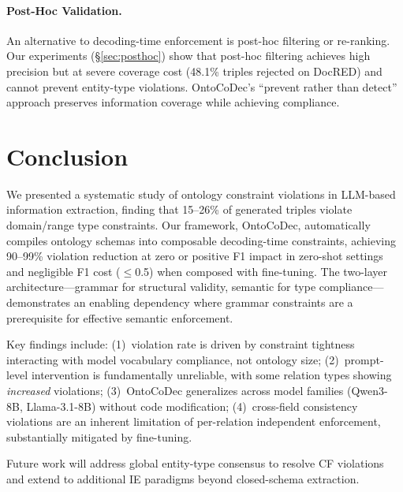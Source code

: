\documentclass[11pt,a4paper]{article}
\newcommand{\sys}{OntoCoDec}
\newcommand{\pp}{\text{pp}}
\begin{document}
\paragraph{Post-Hoc Validation.}
An alternative to decoding-time enforcement is post-hoc filtering or re-ranking.
Our experiments (\S\ref{sec:posthoc}) show that post-hoc filtering achieves high precision but at severe coverage cost (48.1\% triples rejected on DocRED) and cannot prevent entity-type violations.
\sys{}'s ``prevent rather than detect'' approach preserves information coverage while achieving compliance.

\section{Conclusion}
\label{sec:conclusion}

We presented a systematic study of ontology constraint violations in LLM-based information extraction, finding that 15--26\% of generated triples violate domain/range type constraints.
Our framework, \sys{}, automatically compiles ontology schemas into composable decoding-time constraints, achieving 90--99\% violation reduction at zero or positive F1 impact in zero-shot settings and negligible F1 cost ($\leq$0.5\pp{}) when composed with fine-tuning.
The two-layer architecture---grammar for structural validity, semantic for type compliance---demonstrates an enabling dependency where grammar constraints are a prerequisite for effective semantic enforcement.

Key findings include: (1)~violation rate is driven by constraint tightness interacting with model vocabulary compliance, not ontology size; (2)~prompt-level intervention is fundamentally unreliable, with some relation types showing \emph{increased} violations; (3)~\sys{} generalizes across model families (Qwen3-8B, Llama-3.1-8B) without code modification; (4)~cross-field consistency violations are an inherent limitation of per-relation independent enforcement, substantially mitigated by fine-tuning.

Future work will address global entity-type consensus to resolve CF violations and extend to additional IE paradigms beyond closed-schema extraction.


\end{document}
